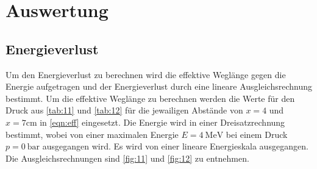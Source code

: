 \section{Auswertung}
\label{sec:Auswertung}

\subsection{Energieverlust}
Um den Energieverlust zu berechnen wird die effektive Weglänge gegen die Energie aufgetragen und der Energieverlust
durch eine lineare Ausgleichsrechnung bestimmt.
Um die effektive Weglänge zu berechnen werden die Werte für den Druck aus \autoref{tab:11} und \autoref{tab:12} für die jewailigen Abstände von $x=4$ und $x=7\unit{\centi\meter}$ in \autoref{eqn:eff}
eingesetzt. Die Energie wird in einer Dreisatzrechnung bestimmt, wobei von einer maximalen Energie $E = \qty{4}{\mega\electronvolt}$
bei einem Druck $p = \qty{0}{\bar}$ ausgegangen wird. Es wird von einer lineare Energieskala ausgegangen. Die Ausgleichsrechnungen sind
\autoref{fig:11} und \autoref{fig:12} zu entnehmen. 

